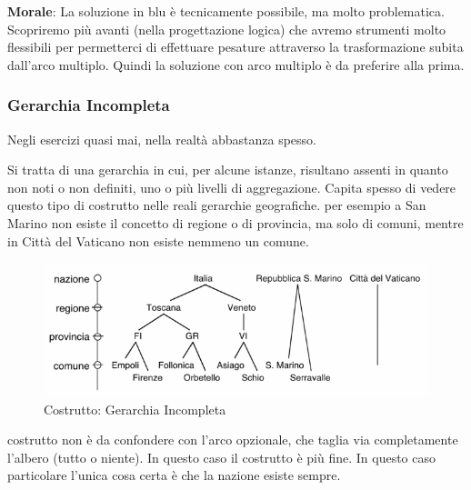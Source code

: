 \noindent\textbf{Morale}: La soluzione in blu è tecnicamente possibile, ma molto problematica.
Scopriremo più avanti (nella progettazione logica) che avremo strumenti molto flessibili per permetterci di effettuare pesature attraverso la trasformazione subita dall'arco multiplo. Quindi la soluzione con arco multiplo è da preferire alla prima.
\subsubsection{Gerarchia Incompleta}
\begin{info}
	Negli esercizi quasi mai, nella realtà abbastanza spesso.
\end{info}
Si tratta di una gerarchia in cui, per alcune istanze, risultano assenti in quanto non noti o non definiti, uno o più livelli di aggregazione.\newline
Capita spesso di vedere questo tipo di costrutto nelle reali gerarchie geografiche. per esempio a San Marino non esiste il concetto di regione o di provincia, ma solo di comuni, mentre in Città del Vaticano non esiste nemmeno un comune.
\begin{figure}[H]
	\begin{center}
		\includegraphics[width=0.9\linewidth]{img/incoml.PNG}
		\caption{Costrutto: Gerarchia Incompleta}
	\end{center}
\end{figure}
\noindent costrutto non è da confondere con l'arco opzionale, che taglia via completamente l'albero (tutto o niente). In questo caso il costrutto è più fine. In questo caso particolare l'unica cosa certa è che la nazione esiste sempre.
